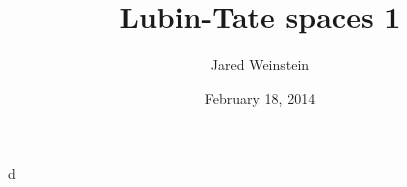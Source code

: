 \documentclass{article}
\title{Lubin-Tate spaces 1}
\author{Jared Weinstein}
\date{February 18, 2014}
\begin{document}
\maketitle





d
\end{document}

